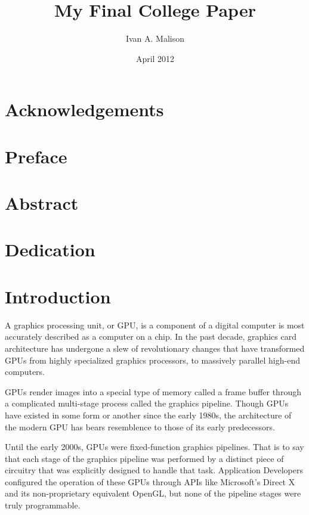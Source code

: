 \documentclass[12pt,twoside]{reedthesis}
\title{My Final College Paper}
\author{Ivan A. Malison}
\date{April 2012}
\begin{document}
  \maketitle
  \frontmatter 
  \pagestyle{empty}

  \chapter*{Acknowledgements}

    \chapter*{Preface}

    \tableofcontents

    \chapter*{Abstract}
	
	\chapter*{Dedication}

  \mainmatter 
  \pagestyle{fancyplain}

    \chapter*{Introduction}

A graphics processing unit, or GPU, is a component of a digital computer is most accurately described as a computer on a chip. In the past decade, graphics card architecture has undergone a slew of revolutionary changes that have transformed GPUs from highly specialized graphics processors, to massively parallel high-end computers.

GPUs render images into a special type of memory called a frame buffer through a complicated multi-stage process called the graphics pipeline. Though GPUs have existed in some form or another since the early 1980s, the architecture of the modern GPU has bears resemblence to those of its early predecessors.

Until the early 2000s, GPUs were fixed-function graphics pipelines. That is to say that each stage of the graphics pipeline was performed by a distinct piece of circuitry that was explicitly designed to handle that task. Application Developers configured the operation of these GPUs through APIs like Microsoft's Direct X and its non-proprietary equivalent OpenGL, but none of the pipeline stages were truly programmable.
\end{document}

